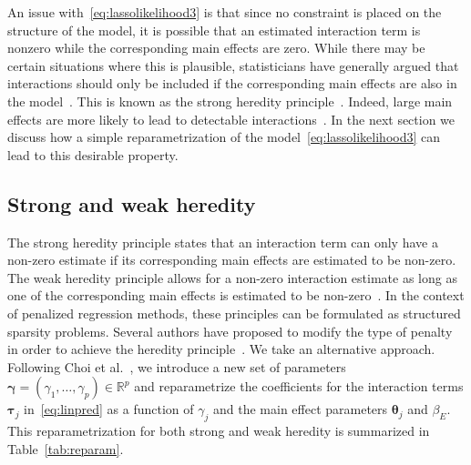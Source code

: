 \documentclass[12pt,letter]{article}\usepackage[]{graphicx}\usepackage[]{color}
\makeatletter
\newcommand{\tm}[1]{\textrm{{#1}}}
\newcommand{\balpha}{\boldsymbol{\alpha}}
\newcommand{\btau}{\boldsymbol{\tau}}
\newcommand{\bgamma}{\boldsymbol{\gamma}}
\newcommand{\btheta}{\boldsymbol{\theta}}
\DeclarePairedDelimiter\norm{\lVert}{\rVert}%
\let\oldnorm\norm
\def\norm{\@ifstar{\oldnorm}{\oldnorm*}}
\makeatother
\begin{document}
An issue with~\eqref{eq:lassolikelihood3} is that since no constraint is placed on the structure of the model, it is possible that an estimated interaction term is nonzero while the corresponding main effects are zero. While there may be certain situations where this is plausible, statisticians have generally argued that interactions should only be included if the corresponding main effects are also in the model~\citep{mccullagh1989generalized}. This is known as the strong heredity principle~\citep{chipman1996bayesian}. Indeed, large main effects are more likely to lead to detectable interactions~\citep{cox1984interaction}. In the next section we discuss how a simple reparametrization of the model~\eqref{eq:lassolikelihood3} can lead to this desirable property.

\subsection{Strong and weak heredity}

The strong heredity principle states that an interaction term can only have a non-zero estimate if its corresponding main effects are estimated to be non-zero. The weak heredity principle allows for a non-zero interaction estimate as long as one of the corresponding main effects is estimated to be non-zero~\citep{chipman1996bayesian}. In the context of penalized regression methods, these principles can be formulated as structured sparsity \citep{bach2012structured} problems. Several authors have proposed to modify the type of penalty in order to achieve the heredity principle~\citep{radchenko2010variable,bien2013lasso,lim2015learning,haris2016convex}. We take an alternative approach. Following Choi et al.~\citep{choi2010variable}, we introduce a new set of parameters $\bgamma = (\gamma_1, \ldots, \gamma_p)\in \mathbb{R}^p$ and reparametrize the coefficients for the interaction terms $\btau_j$ in~\eqref{eq:linpred} as a function of $\gamma_j$ and the main effect parameters $\btheta_j$ and $\beta_E$. This reparametrization for both strong and weak heredity is summarized in Table~\ref{tab:reparam}.
\end{document}

